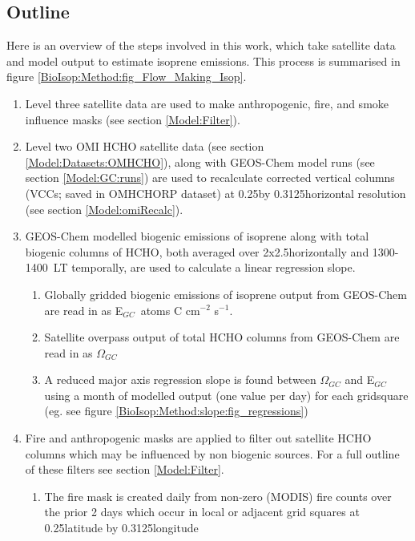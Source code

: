   \subsection{Outline}
    Here is an overview of the steps involved in this work, which take satellite data and model output to estimate isoprene emissions.
    This process is summarised in figure \ref{BioIsop:Method:fig_Flow_Making_Isop}.
    \begin{enumerate}
      \item 
        Level three satellite data are used to make anthropogenic, fire, and smoke influence masks (see section \ref{Model:Filter}).
      \item 
        Level two OMI HCHO satellite data (see section \ref{Model:Datasets:OMHCHO}), along with GEOS-Chem model runs (see section \ref{Model:GC:runs}) are used to recalculate corrected vertical columns (VCCs; saved in OMHCHORP dataset) at 0.25\degr by 0.3125\degr horizontal resolution (see section \ref{Model:omiRecalc}).
      \item 
        GEOS-Chem modelled biogenic emissions of isoprene along with total biogenic columns of HCHO, both averaged over 2x2.5\degr horizontally  and 1300-1400~LT temporally, are used to calculate a linear regression slope.
      \begin{enumerate}
        \item Globally gridded biogenic emissions of isoprene output from GEOS-Chem are read in as E$_{GC}$~atoms C cm$^{-2}$ s$^{-1}$.
        \item Satellite overpass output of total HCHO columns from GEOS-Chem are read in as $\Omega_{GC}$\moleccm
        \item A reduced major axis regression slope is found between $\Omega_{GC}$ and E$_{GC}$ using a month of modelled output (one value per day) for each gridsquare (eg. see figure \ref{BioIsop:Method:slope:fig_regressions})
      \end{enumerate}
      \item 
        Fire and anthropogenic masks are applied to filter out satellite HCHO columns which may be influenced by non biogenic sources.
        For a full outline of these filters see section \ref{Model:Filter}.
      \begin{enumerate}
        \item 
          The fire mask is created daily from non-zero (MODIS) fire counts over the prior 2 days which occur in local or adjacent grid squares at 0.25\degr latitude by 0.3125\degr longitude

\end{enumerate}
\end{enumerate}
